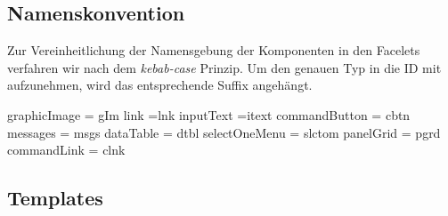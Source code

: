 \newcommand{\ftable}[1]{\begin{sidewaystable}
\begin{tabular}[H]{ |m{1.5cm}| m{1.5cm}| m{3cm}| m{7cm} |m{4cm}| m{4cm}| }
    \toprule
    \textbf{ID} & \textbf{Typ} & \textbf{Beschreibung} & \textbf{Binding} & \textbf{Constraints} & \textbf{Validator \newline Converter} \\
    \midrule
    #1
\end{tabular}
\end{sidewaystable}
}

\newcommand{\fentry}[6]{\footnotesize#1 &\footnotesize#2 &\footnotesize#3 &\footnotesize#4 &\footnotesize#5 &\footnotesize#6\\\hline}


\subsection{Namenskonvention}

Zur Vereinheitlichung der Namensgebung der Komponenten in den Facelets verfahren wir nach dem \emph{kebab-case} Prinzip. Um den genauen Typ in die ID mit aufzunehmen, wird das entsprechende Suffix angehängt.

 graphicImage = gIm link =lnk inputText =itext commandButton = cbtn messages = msgs dataTable = dtbl selectOneMenu = slctom panelGrid = pgrd commandLink = clnk

\subsection{Templates}

